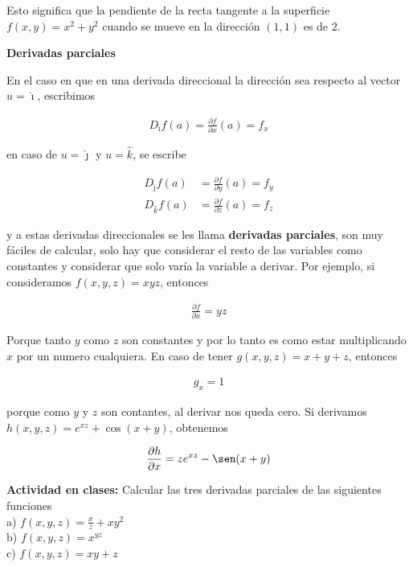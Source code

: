 \documentclass{article}
\theoremstyle{definition}
\begin{document}
Esto significa que la pendiente de la recta tangente a la superficie $f(x,y) =x^2+y^2$ cuando se mueve en la dirección $(1,1)$ es de $2$. \\


\newpage

\begin{center}
    \Large{\textbf{Derivadas parciales}}
\end{center}

En el caso en que en una derivada direccional la dirección sea respecto al vector $u=\hat{\imath}$, escribimos

\begin{align*}
    D_{\hat{\imath}} f (a) = \frac{\partial f}{\partial x} (a) =f_x
\end{align*}

en caso de $u=\hat{\jmath}$ y $u=\hat{k}$, se escribe

\begin{align*}
    D_{\hat{\jmath}} f (a) &= \frac{\partial f}{\partial y} (a) = f_y \\
    D_{\hat{k}} f (a) &= \frac{\partial f}{\partial z} (a) = f_z
\end{align*}

y a estas derivadas direccionales se les llama \textbf{derivadas parciales}, son muy fáciles de calcular, solo hay que considerar el resto de las variables como constantes y considerar que solo varía la variable a derivar. Por ejemplo, si consideramos $f(x,y,z) = xyz$, entonces

\begin{align*}
   \frac{\partial f}{\partial x} =yz
\end{align*}

Porque tanto $y$ como $z$ son constantes y por lo tanto es como estar multiplicando $x$ por un numero cualquiera. En caso de tener $g(x,y,z) = x+y+z$, entonces


\begin{align*}
   g_x = 1
\end{align*}

porque como $y$ y $z$ son contantes, al derivar nos queda cero. Si derivamos $h(x,y,z) = e^{xz}+\cos(x+y)$, obtenemos

\begin{align*}
   \frac{\partial h}{\partial x} = ze^{xz}-\sen(x+y)
\end{align*}

\textbf{Actividad en clases: } Calcular las tres derivadas parciales de las siguientes funciones\\

a) $\displaystyle f(x,y,z) = \frac{x}{z} + xy^2$ \\

b) $\displaystyle f(x,y,z) = x^{yz}$ \\

c) $\displaystyle f(x,y,z) = xy+z$ \\
\end{document}

